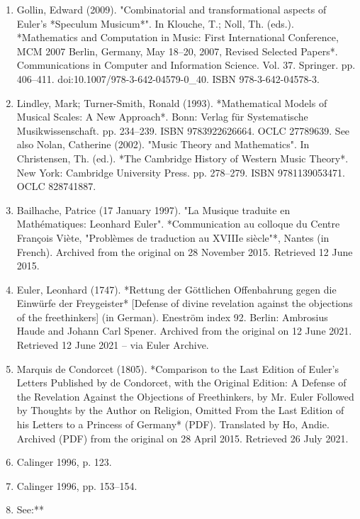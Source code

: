 \begin{enumerate}
\item Gollin, Edward (2009). "Combinatorial and transformational aspects of Euler's *Speculum Musicum*". In Klouche, T.; Noll, Th. (eds.). *Mathematics and Computation in Music: First International Conference, MCM 2007 Berlin, Germany, May 18–20, 2007, Revised Selected Papers*. Communications in Computer and Information Science. Vol. 37. Springer. pp. 406–411. doi:10.1007/978-3-642-04579-0_40. ISBN 978-3-642-04578-3.
\item Lindley, Mark; Turner-Smith, Ronald (1993). *Mathematical Models of Musical Scales: A New Approach*. Bonn: Verlag für Systematische Musikwissenschaft. pp. 234–239. ISBN 9783922626664. OCLC 27789639. See also Nolan, Catherine (2002). "Music Theory and Mathematics". In Christensen, Th. (ed.). *The Cambridge History of Western Music Theory*. New York: Cambridge University Press. pp. 278–279. ISBN 9781139053471. OCLC 828741887.
\item Bailhache, Patrice (17 January 1997). "La Musique traduite en Mathématiques: Leonhard Euler". *Communication au colloque du Centre François Viète, "Problèmes de traduction au XVIIIe siècle"*, Nantes (in French). Archived from the original on 28 November 2015. Retrieved 12 June 2015.
\item Euler, Leonhard (1747). *Rettung der Göttlichen Offenbahrung gegen die Einwürfe der Freygeister* [Defense of divine revelation against the objections of the freethinkers] (in German). Eneström index 92. Berlin: Ambrosius Haude and Johann Carl Spener. Archived from the original on 12 June 2021. Retrieved 12 June 2021 – via Euler Archive.
\item Marquis de Condorcet (1805). *Comparison to the Last Edition of Euler's Letters Published by de Condorcet, with the Original Edition: A Defense of the Revelation Against the Objections of Freethinkers, by Mr. Euler Followed by Thoughts by the Author on Religion, Omitted From the Last Edition of his Letters to a Princess of Germany* (PDF). Translated by Ho, Andie. Archived (PDF) from the original on 28 April 2015. Retrieved 26 July 2021.
\item Calinger 1996, p. 123.
\item Calinger 1996, pp. 153–154.

\item See:**


\end{enumerate}
